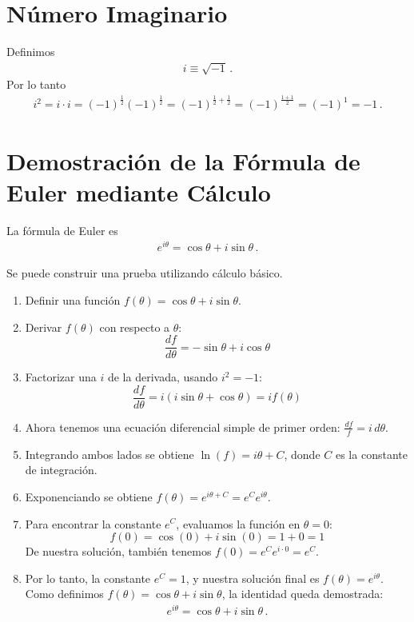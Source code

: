 \documentclass[11pt,a4paper]{book}
\begin{document}
\section{Número Imaginario}
Definimos
\begin{align}
    i \equiv \sqrt{-1}\,.
\end{align}
Por lo tanto
\begin{align}
    i^2 = i\cdot i = (-1)^{\frac{1}{2}}(-1)^{\frac{1}{2}}=(-1)^{\frac{1}{2}+\frac{1}{2}}
    =(-1)^{\frac{1+1}{2}}= (-1)^1 = -1\,.
\end{align}
\section{Demostración de la Fórmula de Euler mediante Cálculo}
La fórmula de Euler es
    \begin{align*}
        e^{i\theta} = \cos\theta + i\sin\theta\,.
    \end{align*}

Se puede construir una prueba utilizando cálculo básico.
\begin{enumerate}
    \item Definir una función $f(\theta) = \cos\theta + i\sin\theta$.
    \item Derivar $f(\theta)$ con respecto a $\theta$:
    \[ \frac{df}{d\theta} = -\sin\theta + i\cos\theta \]
    \item Factorizar una $i$ de la derivada, usando $i^2=-1$:
    \[ \frac{df}{d\theta} = i(i\sin\theta + \cos\theta) = i f(\theta) \]
    \item Ahora tenemos una ecuación diferencial simple de primer orden: $\frac{df}{f} = i \, d\theta$.
    \item Integrando ambos lados se obtiene $\ln(f) = i\theta + C$, donde $C$ es la constante de integración.
    \item Exponenciando se obtiene $f(\theta) = e^{i\theta+C} = e^C e^{i\theta}$.
    \item Para encontrar la constante $e^C$, evaluamos la función en $\theta=0$:
    \[ f(0) = \cos(0) + i\sin(0) = 1 + 0 = 1 \]
    De nuestra solución, también tenemos $f(0) = e^C e^{i \cdot 0} = e^C$.
    \item Por lo tanto, la constante $e^C=1$, y nuestra solución final es $f(\theta) = e^{i\theta}$. Como definimos $f(\theta) = \cos\theta + i\sin\theta$, la identidad queda demostrada:
    \begin{align}
    \boxed{
        e^{i\theta} = \cos\theta + i\sin\theta\,.
        }
    \end{align}
\end{enumerate}
\end{document}
